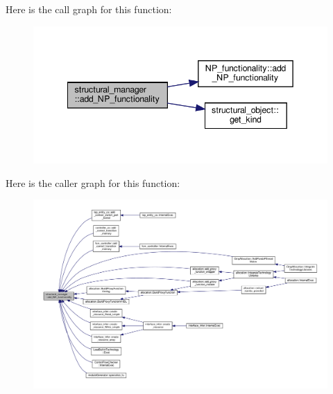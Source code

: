 Here is the call graph for this function\+:
\nopagebreak
\begin{figure}[H]
\begin{center}
\leavevmode
\includegraphics[width=342pt]{d7/d6b/classstructural__manager_a5191c94761bf9616a0f19815e2fe1057_cgraph}
\end{center}
\end{figure}
Here is the caller graph for this function\+:
\nopagebreak
\begin{figure}[H]
\begin{center}
\leavevmode
\includegraphics[width=350pt]{d7/d6b/classstructural__manager_a5191c94761bf9616a0f19815e2fe1057_icgraph}
\end{center}
\end{figure}
\mbox{\label{classstructural__manager_a64e0c143cffd76072a1d5b885304a85a}} 
